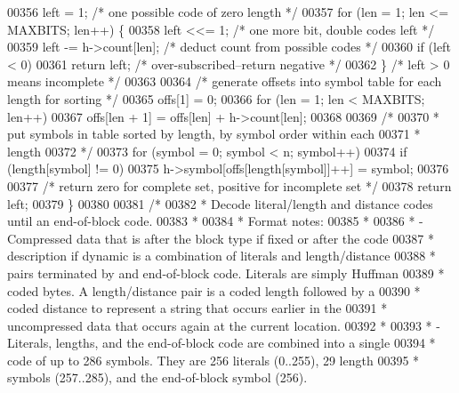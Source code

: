 \begin{DoxyCode}
00356     left = 1;                           \textcolor{comment}{/* one possible code of zero length */}
00357     \textcolor{keywordflow}{for} (len = 1; len <= MAXBITS; len++) \{
00358         left <<= 1;                     \textcolor{comment}{/* one more bit, double codes left */}
00359         left -= h->count[len];          \textcolor{comment}{/* deduct count from possible codes */}
00360         \textcolor{keywordflow}{if} (left < 0)
00361             \textcolor{keywordflow}{return} left;                \textcolor{comment}{/* over-subscribed--return negative */}
00362     \}                                   \textcolor{comment}{/* left > 0 means incomplete */}
00363 
00364     \textcolor{comment}{/* generate offsets into symbol table for each length for sorting */}
00365     offs[1] = 0;
00366     \textcolor{keywordflow}{for} (len = 1; len < MAXBITS; len++)
00367         offs[len + 1] = offs[len] + h->count[len];
00368 
00369     \textcolor{comment}{/*}
00370 \textcolor{comment}{     * put symbols in table sorted by length, by symbol order within each}
00371 \textcolor{comment}{     * length}
00372 \textcolor{comment}{     */}
00373     for (symbol = 0; symbol < n; symbol++)
00374         \textcolor{keywordflow}{if} (length[symbol] != 0)
00375             h->symbol[offs[length[symbol]]++] = symbol;
00376 
00377     \textcolor{comment}{/* return zero for complete set, positive for incomplete set */}
00378     \textcolor{keywordflow}{return} left;
00379 \}
00380 
00381 \textcolor{comment}{/*}
00382 \textcolor{comment}{ * Decode literal/length and distance codes until an end-of-block code.}
00383 \textcolor{comment}{ *}
00384 \textcolor{comment}{ * Format notes:}
00385 \textcolor{comment}{ *}
00386 \textcolor{comment}{ * - Compressed data that is after the block type if fixed or after the code}
00387 \textcolor{comment}{ *   description if dynamic is a combination of literals and length/distance}
00388 \textcolor{comment}{ *   pairs terminated by and end-of-block code.  Literals are simply Huffman}
00389 \textcolor{comment}{ *   coded bytes.  A length/distance pair is a coded length followed by a}
00390 \textcolor{comment}{ *   coded distance to represent a string that occurs earlier in the}
00391 \textcolor{comment}{ *   uncompressed data that occurs again at the current location.}
00392 \textcolor{comment}{ *}
00393 \textcolor{comment}{ * - Literals, lengths, and the end-of-block code are combined into a single}
00394 \textcolor{comment}{ *   code of up to 286 symbols.  They are 256 literals (0..255), 29 length}
00395 \textcolor{comment}{ *   symbols (257..285), and the end-of-block symbol (256).}

\end{DoxyCode}
